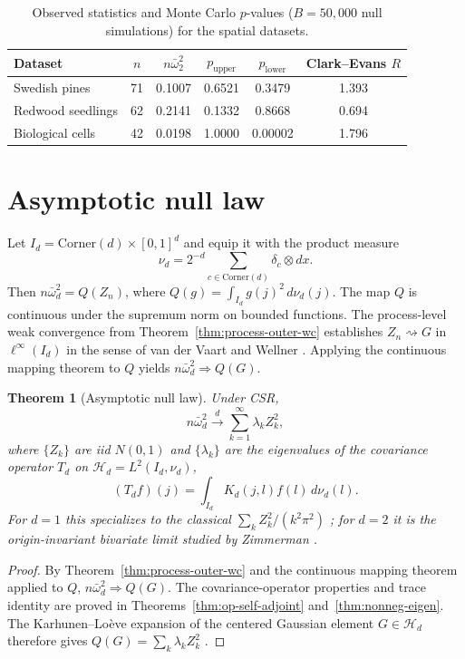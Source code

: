 \documentclass[pdflatex]{sn-jnl}
\theoremstyle{thmstyleone}
\newtheorem{theorem}{Theorem}[section]
\theoremstyle{thmstyletwo}
\theoremstyle{thmstylethree}
\begin{document}
\begin{table}[htbp]
\caption{Observed statistics and Monte Carlo $p$-values ($B = 50{,}000$ null simulations) for the spatial datasets.}\label{tab:real-data}
\begin{tabular*}{\textwidth}{@{\extracolsep\fill}lccccc}
\toprule
Dataset & $n$ & $n\bar\omega^2_2$ & $p_{\mathrm{upper}}$ & $p_{\mathrm{lower}}$ & Clark--Evans $R$ \\
\midrule
Swedish pines      & 71 & 0.1007 & 0.6521 & 0.3479 & 1.393 \\
Redwood seedlings  & 62 & 0.2141 & 0.1332 & 0.8668 & 0.694 \\
Biological cells   & 42 & 0.0198 & 1.0000 & 0.00002 & 1.796 \\
\bottomrule
\end{tabular*}
\end{table}

\section{Asymptotic null law}\label{sec:null-law}

Let $I_d=\mathrm{Corner}(d)\times[0,1]^d$ and equip it with the product measure
\[
  \nu_d=2^{-d}\sum_{c\in\mathrm{Corner}(d)}\delta_c\otimes dx.
\]
Then $n\bar\omega_d^2=Q(Z_n)$, where $Q(g)=\int_{I_d}g(j)^2\,d\nu_d(j)$. The map $Q$ is continuous under the supremum norm on bounded functions. The process-level weak convergence from Theorem~\ref{thm:process-outer-wc} establishes $Z_n\rightsquigarrow G$ in $\ell^\infty(I_d)$ in the sense of van der Vaart and Wellner \cite[\S1.9]{vanderVaartWellner1996}. Applying the continuous mapping theorem to $Q$ yields $n\bar\omega_d^2\Rightarrow Q(G)$.

\begin{theorem}[Asymptotic null law]\label{thm:null-dist}
Under CSR,
\[
  n\bar\omega^2_d \xrightarrow{d} \sum_{k=1}^\infty \lambda_k Z_k^2,
\]
where $\{Z_k\}$ are iid $N(0,1)$ and $\{\lambda_k\}$ are the eigenvalues of the covariance operator $T_d$ on $\mathcal H_d=L^2(I_d,\nu_d)$,
\[
  (T_df)(j)=\int_{I_d}K_d(j,l)f(l)\,d\nu_d(l).
\]
For $d=1$ this specializes to the classical $\sum_k Z_k^2/(k^2\pi^2)$ \cite{KacSiegert1947,AndersonDarling1952,DurbinKnott1972}; for $d=2$ it is the origin-invariant bivariate limit studied by Zimmerman \cite{Zimmerman1994}.
\end{theorem}

\begin{proof}
By Theorem~\ref{thm:process-outer-wc} and the continuous mapping theorem applied to $Q$, $n\bar\omega_d^2\Rightarrow Q(G)$. The covariance-operator properties and trace identity are proved in Theorems~\ref{thm:op-self-adjoint} and~\ref{thm:nonneg-eigen}. The Karhunen--Lo\`eve expansion of the centered Gaussian element $G\in\mathcal H_d$ therefore gives $Q(G)=\sum_k\lambda_kZ_k^2$ \cite{GineNickl2016}.
\end{proof}
\end{document}
